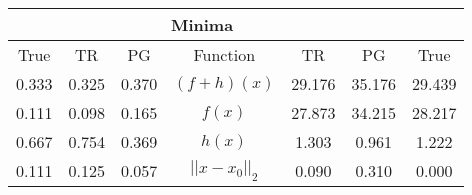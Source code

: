 \begin{tabular}{| c |c |c || c |c |c |c |}
    \hline
    \rowcolor[gray]{0.9}
\multicolumn{3}{|c|}{Parameters} & \multicolumn{4}{|c|}{Minima}\\ \hline True & TR & PG  & Function & TR & PG & True \\
    \hline
  \rowcolor[gray]{0.7}
  0.333 & 0.325 & 0.370   & $ (f + h)(x) $ & 29.176 & 35.176 & 29.439 \\
  \rowcolor[gray]{0.8}
  0.111 & 0.098 & 0.165   & $ f(x) $ & 27.873 & 34.215 & 28.217 \\
  \rowcolor[gray]{0.7}
  0.667 & 0.754 & 0.369   & $ h(x) $ & 1.303 & 0.961 & 1.222 \\
  \rowcolor[gray]{0.8}
  0.111 & 0.125 & 0.057   & $ ||x - x_0||_2 $ & 0.090 & 0.310 & 0.000 \\
\end{tabular}
